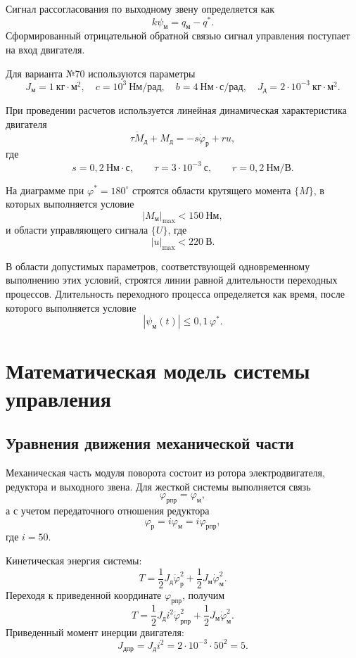 \documentclass[a4paper, 14pt]{extarticle}
\begin{document}
Сигнал рассогласования по выходному звену определяется как
\[
	k\psi_\text{м}=q_\text{м}-q^*.
\]
Сформированный отрицательной обратной связью сигнал управления поступает на вход двигателя.


Для варианта №70 используются параметры
\[
	J_\text{м}=1~\text{кг}\cdot\text{м}^2,\quad
	c=10^3~\text{Нм/рад},\quad
	b=4~\text{Нм}\cdot\text{с/рад},\quad
	J_\text{д}=2\cdot10^{-3}~\text{кг}\cdot\text{м}^2.
\]

При проведении расчетов используется линейная динамическая характеристика двигателя
\[
	\tau \dot M_\text{д}+M_\text{д}=-s\dot\varphi_\text{р}+ru,
\]
где
\[
	s=0{,}2~\text{Нм}\cdot\text{с},\qquad
	\tau=3\cdot10^{-3}~\text{с},\qquad
	r=0{,}2~\text{Нм/В}.
\]

На диаграмме при $\varphi^*=180^\circ$ строятся области крутящего момента $\{M\}$, в которых выполняется условие
\[
	|M_\text{м}|_{\max}<150~\text{Нм},
\]
и области управляющего сигнала $\{U\}$, где
\[
	|u|_{\max}<220~\text{В}.
\]

В области допустимых параметров, соответствующей одновременному выполнению этих условий, строятся линии равной длительности переходных процессов. Длительность переходного процесса определяется как время, после которого выполняется условие
\[
	|\psi_\text{м}(t)|\le 0{,}1\,\varphi^*.
\]

\newpage

\section{Математическая модель системы управления}

\subsection{Уравнения движения механической части}

Механическая часть модуля поворота состоит из ротора электродвигателя, редуктора и выходного звена. Для жесткой системы выполняется связь
\[
	\varphi_{\text{рпр}}=\varphi_\text{м},
\]
а с учетом передаточного отношения редуктора
\[
	\varphi_\text{р}=i\varphi_\text{м}=i\varphi_{\text{рпр}},
\]
где $i=50$.

Кинетическая энергия системы:
\[
	T=\frac{1}{2}J_\text{д}\dot\varphi_\text{р}^2+\frac{1}{2}J_\text{м}\dot\varphi_\text{м}^2.
\]
Переходя к приведенной координате $\varphi_{\text{рпр}}$, получим
\[
	T=\frac{1}{2}J_\text{д}i^2\dot\varphi_{\text{рпр}}^2+\frac{1}{2}J_\text{м}\dot\varphi_\text{м}^2.
\]
Приведенный момент инерции двигателя:
\[
	J_{\text{дпр}}=J_\text{д}i^2=2\cdot10^{-3}\cdot50^2=5.
\]
\end{document}
